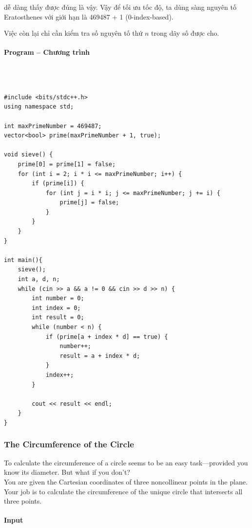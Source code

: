 \documentclass{article}
\begin{document}
dễ dàng thấy được đúng là vậy. Vậy để tối ưu tốc độ, ta dùng sàng nguyên tố Eratosthenes với giới hạn là 469487 + 1 (0-index-based).

Việc còn lại chỉ cần kiểm tra số nguyên tố thứ $n$ trong dãy số được cho.


\paragraph{Program -- Chương trình} \mbox{} \\


\begin{lstlisting}

#include <bits/stdc++.h>
using namespace std;
	
int maxPrimeNumber = 469487;
vector<bool> prime(maxPrimeNumber + 1, true);

void sieve() {
	prime[0] = prime[1] = false;
	for (int i = 2; i * i <= maxPrimeNumber; i++) {
		if (prime[i]) {
			for (int j = i * i; j <= maxPrimeNumber; j += i) {
				prime[j] = false;
			}
		}
	}
}

int main(){
	sieve();
	int a, d, n; 
	while (cin >> a && a != 0 && cin >> d >> n) {
		int number = 0;
		int index = 0;
		int result = 0;
		while (number < n) {
			if (prime[a + index * d] == true) {
				number++;
				result = a + index * d;
			}
			index++;
		}
		
		cout << result << endl;
	}
}

\end{lstlisting}


\subsubsection{The Circumference of the Circle}

To calculate the circumference of a circle seems to be an easy task—provided you know its diameter. But what if you don’t? \\
You are given the Cartesian coordinates of three noncollinear points in the plane. \\
Your job is to calculate the circumference of the unique circle that intersects all three
points.

\paragraph{Input} \mbox{} \\
\end{document}
